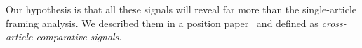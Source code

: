 Our hypothesis is that all these signals will reveal far more than the single-article framing analysis.
We described them in a position paper~\cite{mensio2020towards} and defined as \emph{cross-article comparative signals}.

    

    
